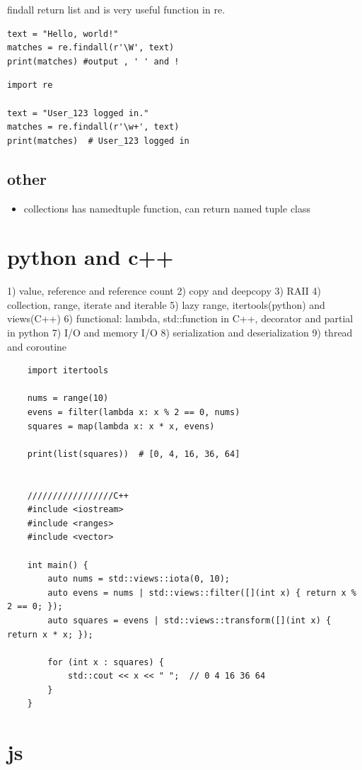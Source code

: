 \documentclass[a4paper,12pt,twoside]{book}
\begin{document}
findall return list and is very useful function in re.
\begin{lstlisting}
text = "Hello, world!"
matches = re.findall(r'\W', text)
print(matches) #output , ' ' and !
\end{lstlisting}

\begin{lstlisting}
import re

text = "User_123 logged in."
matches = re.findall(r'\w+', text)
print(matches)  # User_123 logged in
\end{lstlisting}

\section{other}
\begin{itemize}
	\item collections has namedtuple function, can return named tuple class
\end{itemize}

\chapter{python and c++}
1) value, reference and reference count
2) copy and deepcopy
3) RAII
4) collection, range, iterate and iterable
5) lazy range, itertools(python) and views(C++)
6) functional: lambda, std::function in C++, decorator and partial in python
7) I/O and memory I/O
8) serialization and deserialization 
9) thread and coroutine
\begin{lstlisting}
	import itertools
	
	nums = range(10)
	evens = filter(lambda x: x % 2 == 0, nums)
	squares = map(lambda x: x * x, evens)
	
	print(list(squares))  # [0, 4, 16, 36, 64]
	
	
	/////////////////C++
	#include <iostream>
	#include <ranges>
	#include <vector>
	
	int main() {
		auto nums = std::views::iota(0, 10);
		auto evens = nums | std::views::filter([](int x) { return x % 2 == 0; });
		auto squares = evens | std::views::transform([](int x) { return x * x; });
		
		for (int x : squares) {
			std::cout << x << " ";  // 0 4 16 36 64
		}
	}	
\end{lstlisting}


\chapter{js}




%
\end{document}
